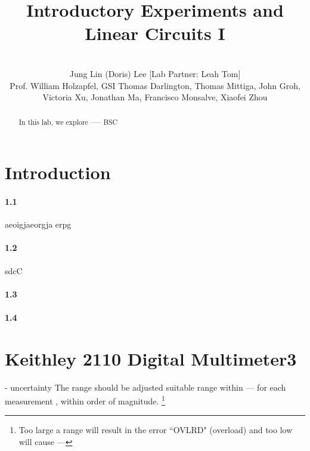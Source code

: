 \documentclass[10pt,letterpaper,oneside] {article}
\begin{document}
\title{Introductory Experiments and Linear Circuits I}
\author{\quad \\Jung Lin (Doris) Lee [Lab Partner: Leah Tom]\\Prof. William Holzapfel, GSI Thomas Darlington, Thomas Mittiga, John Groh,  \\Victoria Xu, Jonathan Ma, Francisco Monsalve, Xiaofei Zhou}
\maketitle
	\begin{abstract}
	In this lab, we explore ----- BSC 
	\end{abstract}


\section{Introduction}
 
 
\paragraph{\textbf{1.1}}
 aeoigjaeorgja erpg 
 
\paragraph{\textbf{1.2}} 
sdcC                                                                                                                                                                                                                                                                                                                                              
 
\paragraph{\textbf{1.3}} 
 
\paragraph{\textbf{1.4}} 
   
 \section{Keithley 2110 Digital Multimeter3}
- uncertainty
The range should be adjusted  suitable range within --- for each measurement , within order of magnitude. \footnote{Too large a range will result in the error ``OVLRD" (overload) and too low will cause ---}
\end{document}
